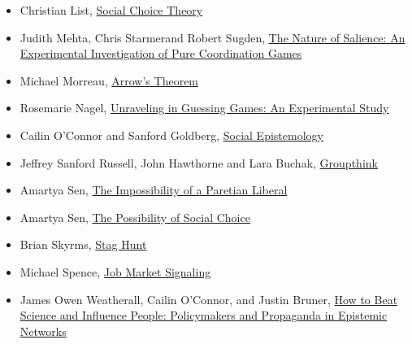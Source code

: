 \documentclass[
  12pt,
  letterpaper,
  DIV=11,
  numbers=noendperiod]{scrartcl}
\begin{document}
\begin{itemize}
\item
  Christian List,
  \href{https://plato.stanford.edu/entries/social-choice/}{Social Choice
  Theory}
\item
  Judith Mehta, Chris Starmerand Robert Sugden,
  \href{https://www.jstor.org/stable/2118074}{The Nature of Salience: An
  Experimental Investigation of Pure Coordination Games}
\item
  Michael Morreau,
  \href{https://plato.stanford.edu/entries/arrows-theorem/}{Arrow's
  Theorem}
\item
  Rosemarie Nagel,
  \href{https://www.jstor.org/stable/2950991}{Unraveling in Guessing
  Games: An Experimental Study}
\item
  Cailin O'Connor and Sanford Goldberg,
  \href{https://plato.stanford.edu/entries/epistemology-social/\#NetwEpisMode}{Social
  Epistemology}
\item
  Jeffrey Sanford Russell, John Hawthorne and Lara Buchak,
  \href{https://philpapers.org/rec/RUSG}{Groupthink}
\item
  Amartya Sen, \href{https://www.jstor.org/stable/1829633}{The
  Impossibility of a Paretian Liberal}
\item
  Amartya Sen, \href{https://www.jstor.org/stable/117024}{The
  Possibility of Social Choice}
\item
  Brian Skyrms, \href{https://www.jstor.org/stable/3218711}{Stag Hunt}
\item
  Michael Spence, \href{https://www.jstor.org/stable/1882010}{Job Market
  Signaling}
\item
  James Owen Weatherall, Cailin O'Connor, and Justin Bruner,
  \href{https://www.journals.uchicago.edu/doi/abs/10.1093/bjps/axy062}{How
  to Beat Science and Influence People: Policymakers and Propaganda in
  Epistemic Networks}
\end{itemize}
\end{document}
